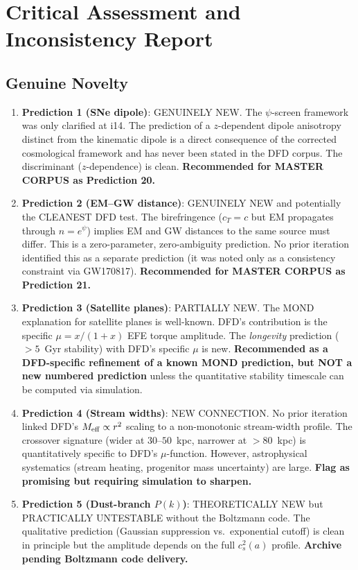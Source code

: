 \documentclass[11pt]{article}
\begin{document}
\section{Critical Assessment and Inconsistency Report}
\label{sec:assessment}

\subsection{Genuine Novelty}

\begin{enumerate}
\item \textbf{Prediction 1 (SNe dipole)}: GENUINELY NEW.  The $\psi$-screen
framework was only clarified at i14.  The prediction of a $z$-dependent
dipole anisotropy distinct from the kinematic dipole is a direct consequence
of the corrected cosmological framework and has never been stated in the DFD
corpus.  The discriminant ($z$-dependence) is clean.
\textbf{Recommended for MASTER CORPUS as Prediction 20.}

\item \textbf{Prediction 2 (EM--GW distance)}: GENUINELY NEW and potentially
the CLEANEST DFD test.  The birefringence ($c_T = c$ but EM propagates
through $n = e^\psi$) implies EM and GW distances to the same source must
differ.  This is a zero-parameter, zero-ambiguity prediction.  No prior
iteration identified this as a separate prediction (it was noted only as
a consistency constraint via GW170817).
\textbf{Recommended for MASTER CORPUS as Prediction 21.}

\item \textbf{Prediction 3 (Satellite planes)}: PARTIALLY NEW.  The MOND
explanation for satellite planes is well-known.  DFD's contribution is the
specific $\mu = x/(1+x)$ EFE torque amplitude.  The \emph{longevity}
prediction ($> 5$~Gyr stability) with DFD's specific $\mu$ is new.
\textbf{Recommended as a DFD-specific refinement of a known MOND prediction,
but NOT a new numbered prediction} unless the quantitative stability
timescale can be computed via simulation.

\item \textbf{Prediction 4 (Stream widths)}: NEW CONNECTION.  No prior
iteration linked DFD's $M_{\rm eff} \propto r^2$ scaling to a
non-monotonic stream-width profile.  The crossover signature (wider
at $30$--$50$~kpc, narrower at $> 80$~kpc) is quantitatively specific
to DFD's $\mu$-function.  However, astrophysical systematics (stream
heating, progenitor mass uncertainty) are large.
\textbf{Flag as promising but requiring simulation to sharpen.}

\item \textbf{Prediction 5 (Dust-branch $P(k)$)}: THEORETICALLY NEW but
PRACTICALLY UNTESTABLE without the Boltzmann code.  The qualitative
prediction (Gaussian suppression vs.\ exponential cutoff) is clean in
principle but the amplitude depends on the full $c_s^2(a)$ profile.
\textbf{Archive pending Boltzmann code delivery.}
\end{enumerate}
\end{document}
